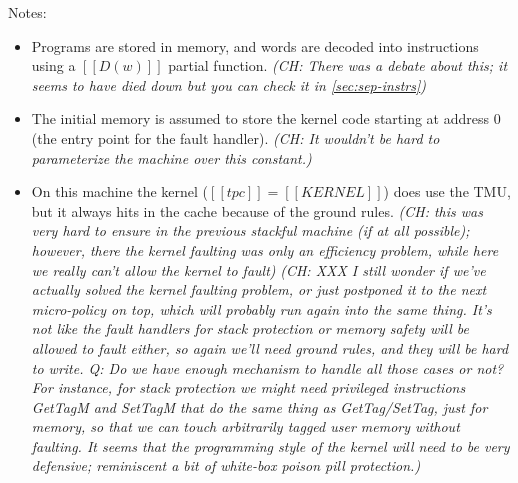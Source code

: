 \documentclass{article}
\newcommand{\ch}[1]{{\color{dkblue}\em (CH: #1)}}
\begin{document}
\noindent
Notes:
\begin{itemize}
\item Programs are stored in memory, and words are decoded into
  instructions using a $[[D(w)]]$ partial function.
  \ch{There was a debate about this; it seems to have died down but
    you can check it in \autoref{sec:sep-instrs}}
\item The initial memory is assumed to store the kernel
  code starting at address 0 (the entry point for the fault handler).
  \ch{It wouldn't be hard to parameterize the machine over this constant.}
\item On this machine the kernel ($[[tpc]] = [[KERNEL]]$) does use the TMU, but
  it always hits in the cache because of the ground rules.
  \ch{this was very hard to ensure in the previous stackful machine
    (if at all possible); however, there the kernel faulting was only
    an efficiency problem, while here we really can't allow the kernel
    to fault}
  \ch{XXX I still wonder if we've actually solved the kernel faulting
    problem, or just
    postponed it to the next micro-policy on top, which will probably
    run again into the same thing. It's not like the fault handlers
    for stack protection or memory safety will be allowed to fault either, so
    again we'll need ground rules, and they will be hard to write. Q:
    Do we have enough mechanism to handle all those cases or not?  For
    instance, for stack protection we might need privileged
    instructions GetTagM and SetTagM that do the same thing as
    GetTag/SetTag, just for memory, so that we can touch arbitrarily
    tagged user memory without faulting. It seems that the programming
    style of the kernel will need to be very defensive; reminiscent a
    bit of white-box poison pill protection.}


\end{itemize}
\end{document}
